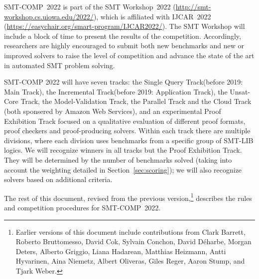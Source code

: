 \documentclass[12pt]{article}
\newcommand{\maintrack}{Single Query Track\xspace}
\newcommand{\inctrack}{Incremental Track\xspace}
\newcommand{\ucoretrack}{Unsat-Core Track\xspace}
\newcommand{\mvaltrack}{Model-Validation Track\xspace}
\newcommand{\paralleltrack}{Parallel Track\xspace}
\newcommand{\cloudtrack}{Cloud Track\xspace}
\newcommand{\prooftrack}{Proof Exhibition Track\xspace}
\begin{document}
SMT-COMP~2022 is part of the SMT Workshop~2022
(\url{http://smt-workshop.cs.uiowa.edu/2022/}),
which is affiliated with IJCAR~2022 (\url{https://easychair.org/smart-program/IJCAR2022/}).
The SMT Workshop will include a block of time to present the results of the
competition.
%
Accordingly, researchers are highly encouraged to submit both new
benchmarks and new or improved solvers to raise the level of
competition and advance the state of the art in automated SMT problem
solving.

SMT-COMP 2022 will have seven tracks: the \maintrack (before 2019: Main Track),
the \inctrack (before 2019: Application Track), the \ucoretrack, the \mvaltrack,
the \paralleltrack{} and the \cloudtrack{} (both sponsered by Amazon Web
Services), and an experimental \prooftrack{} focused on a qualitative evaluation
of different proof formats, proof checkers and proof-producing solvers.
%
Within each track there are multiple divisions, where each division
uses benchmarks from a specific group of SMT-LIB logics.
%
We will recognize winners in all tracks but the \prooftrack{}.
%
They will be determined by the number of benchmarks solved (taking into account
the weighting detailed in Section~\ref{sec:scoring}); we will also recognize
solvers based on additional criteria.

The rest of this document, revised from the previous
version,\footnote{Earlier versions of this document include
  contributions from Clark Barrett, Roberto Bruttomesso, David Cok,
  Sylvain Conchon, David D{\'e}harbe, Morgan Deters, Alberto Griggio,
  Liana Hadarean,
  Matthias Heizmann, Antti Hyvarinen, Aina Niemetz, Albert Oliveras, Giles Reger, Aaron Stump,
  and Tjark Weber.}  describes the rules and competition procedures for
SMT-COMP~2022.
%
\end{document}
